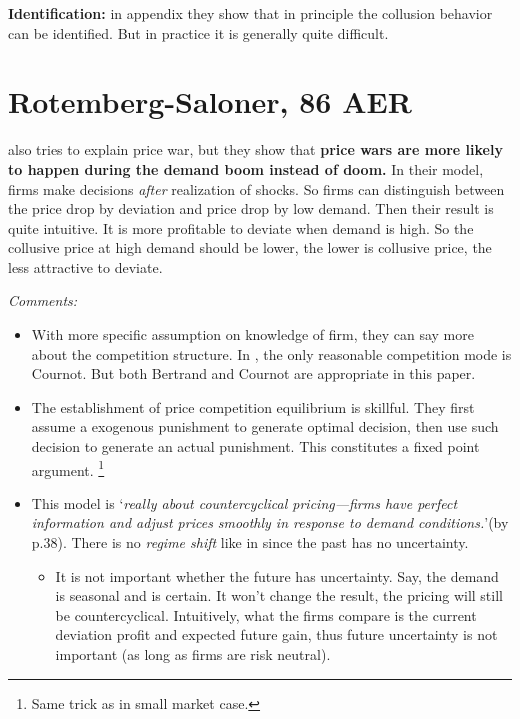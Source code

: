 \documentclass{book}
\theoremstyle{plain}
\theoremstyle{definition}
\begin{document}
\textbf{Identification:} in appendix they show that in principle the collusion behavior can be identified.
But in practice it is generally quite difficult.



\section{Rotemberg-Saloner, 86 AER} %
\label{sec:rotemberg_saloner_86_aer}

\textbf{}
\vspace{1em}

\cite{RotembergSaloner:86aer} also tries to explain price war, but they show that \textbf{price wars are more likely to happen during the demand boom instead of doom.}
In their model, firms make decisions \textit{after} realization of shocks.
So firms can distinguish between the price drop by deviation and price drop by low demand.
Then their result is quite intuitive.
It is more profitable to deviate when demand is high.
So the collusive price at high demand should be lower, the lower is collusive price, the less attractive to deviate.

\vspace{1em}
\noindent
\textit{Comments:}
\begin{itemize}
	\item With more specific assumption on knowledge of firm, they can say more about the competition structure.
	In \cite{Green_Porter:1984EMCA}, the only reasonable competition mode is Cournot.
	But both Bertrand and Cournot are appropriate in this paper.
	\item The establishment of price competition equilibrium is skillful.
	They first assume a exogenous punishment to generate optimal decision, then use such decision to generate an actual punishment.
	This constitutes a fixed point argument.
	\footnote{Same trick as in \cite{Peters_Siow:2002dx} small market case.}

	\item This model is `\textit{really about countercyclical pricing---firms have perfect information and adjust prices smoothly in response to demand conditions.}'(by \cite{Ellison:94RAND} p.38).
	There is no \textit{regime shift} like in \cite{Green_Porter:1984EMCA} since the past has no uncertainty.
	\begin{itemize}
		\item It is not important whether the future has uncertainty. Say, the demand is seasonal and is certain. It won't change the result, the pricing will still be countercyclical. Intuitively, what the firms compare is the current deviation profit and expected future gain, thus future uncertainty is not important (as long as firms are risk neutral).
	\end{itemize}
\end{itemize}
\end{document}
